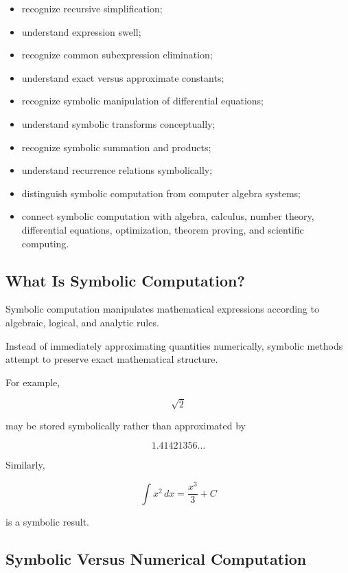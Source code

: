 {\begin{itemize}
    \item recognize recursive simplification;
    \item understand expression swell;
    \item recognize common subexpression elimination;
    \item understand exact versus approximate constants;
    \item recognize symbolic manipulation of differential equations;
    \item understand symbolic transforms conceptually;
    \item recognize symbolic summation and products;
    \item understand recurrence relations symbolically;
    \item distinguish symbolic computation from computer algebra systems;
    \item connect symbolic computation with algebra, calculus, number
          theory, differential equations, optimization, theorem proving,
          and scientific computing.
\end{itemize}
}

\subsection{What Is Symbolic Computation?}
\label{subsec:what-is-symbolic-computation}

Symbolic computation manipulates mathematical expressions according to
algebraic, logical, and analytic rules.

Instead of immediately approximating quantities numerically, symbolic
methods attempt to preserve exact mathematical structure.

For example,

\[
\boxed{
\sqrt{2}
}
\]

may be stored symbolically rather than approximated by

\[
1.41421356\ldots
\]

Similarly,

\[
\boxed{
\int x^2\,dx
=
\frac{x^3}{3}+C
}
\]

is a symbolic result.

\subsection{Symbolic Versus Numerical Computation}
\label{subsec:symbolic-versus-numerical}

